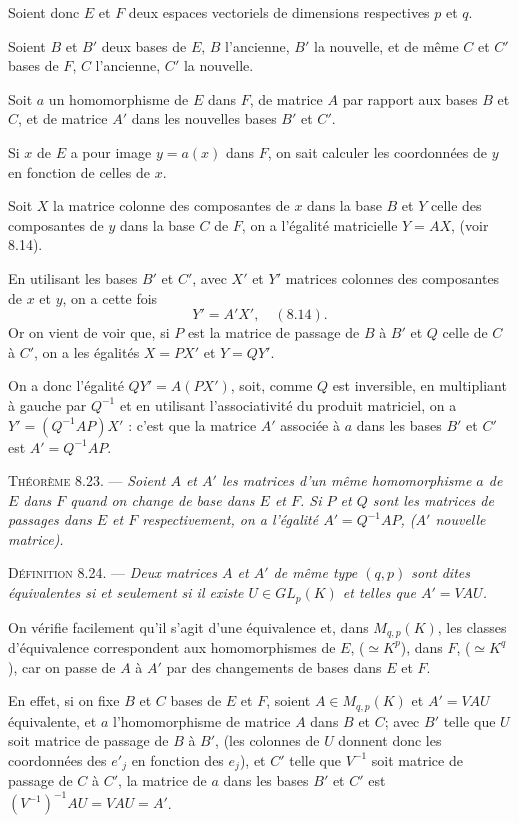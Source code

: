 Soient donc $E$ et $F$ deux espaces vectoriels de dimensions respectives $p$ et $q$.

Soient $B$ et $B'$ deux bases de $E$, $B$ l'ancienne, $B'$ la nouvelle, et de même $C$ et $C'$ bases de $F$, $C$ l'ancienne, $C'$ la nouvelle.

Soit $a$ un homomorphisme de $E$ dans $F$, de matrice $A$ par rapport aux bases $B$ et $C$, et de matrice $A'$ dans les nouvelles bases $B'$ et $C'$.

Si $x$ de $E$ a pour image $y=a(x)$ dans $F$, on sait calculer les coordonnées de $y$ en fonction de celles de $x$.

Soit $X$ la matrice colonne des composantes de $x$ dans la base $B$ et $Y$ celle des composantes de $y$ dans la base $C$ de $F$, on a l'égalité matricielle $Y=AX$, (voir 8.14).

En utilisant les bases $B'$ et $C'$, avec $X'$ et $Y'$ matrices colonnes des composantes de $x$ et $y$, on a cette fois
\[
Y'=A'X',\quad(8.14).
\]
Or on vient de voir que, si $P$ est la matrice de passage de $B$ à $B'$ et $Q$ celle de $C$ à $C'$, on a les égalités $X=PX'$ et $Y=QY'$.

On a donc l'égalité $QY'=A(PX')$, soit, comme $Q$ est inversible, en multipliant à gauche par $Q^{-1}$ et en utilisant l'associativité du produit matriciel, on a $Y'=(Q^{-1}AP)X'$ : c'est que la matrice $A'$ associée à $a$ dans les bases $B'$ et $C'$ est $A'=Q^{-1}AP$.

\medskip\noindent\textsc{Théorème 8.23.} --- \emph{Soient $A$ et $A'$ les matrices d'un même homomorphisme $a$ de $E$ dans $F$ quand on change de base dans $E$ et $F$. Si $P$ et $Q$ sont les matrices de passages dans $E$ et $F$ respectivement, on a l'égalité $A'=Q^{-1}AP$, ($A'$ nouvelle matrice).} \bookend

\medskip\noindent\textsc{Définition 8.24.} --- \emph{Deux matrices $A$ et $A'$ de même type $(q,p)$ sont dites équivalentes si et seulement si il existe $U\in GL_p(K)$ et  telles que $A'=VAU$.}

On vérifie facilement qu'il s'agit d'une équivalence et, dans $M_{q,p}(K)$, les classes d'équivalence correspondent aux homomorphismes de $E$, ($\simeq K^p$), dans $F$, ($\simeq K^q$), car on passe de $A$ à $A'$ par des changements de bases dans $E$ et $F$.

En effet, si on fixe $B$ et $C$ bases de $E$ et $F$, soient $A\in M_{q,p}(K)$ et $A'=VAU$ équivalente, et $a$ l'homomorphisme de matrice $A$ dans $B$ et $C$; avec $B'$ telle que $U$ soit matrice de passage de $B$ à $B'$, (les colonnes de $U$ donnent donc les coordonnées des $e'_j$ en fonction des $e_j$), et $C'$ telle que $V^{-1}$ soit matrice de passage de $C$ à $C'$, la matrice de $a$ dans les bases $B'$ et $C'$ est $(V^{-1})^{-1}AU=VAU=A'$. \bookend

